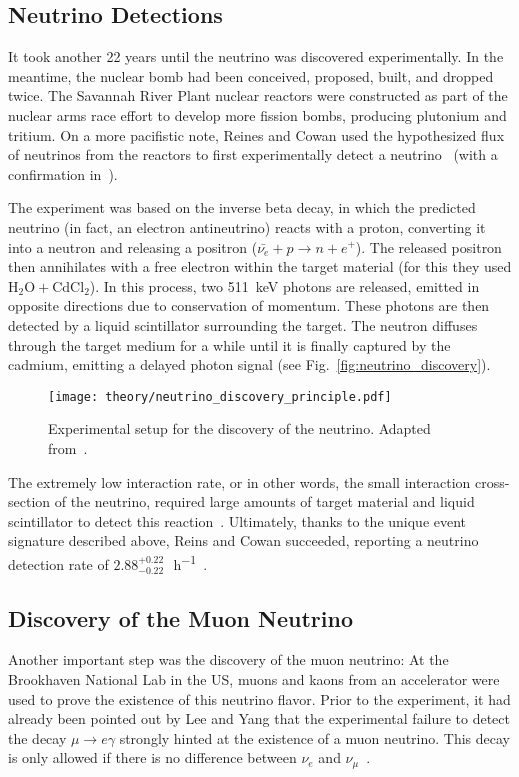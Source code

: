\subsection{Neutrino Detections}
It took another 22 years until the neutrino was discovered experimentally. In the meantime, the nuclear bomb had been conceived, proposed, built, and dropped twice. The Savannah River Plant nuclear reactors were constructed as part of the nuclear arms race effort to develop more fission bombs, producing plutonium and tritium. On a more pacifistic note, Reines and Cowan used the hypothesized flux of neutrinos from the reactors to first experimentally detect a neutrino~\cite{Reines1956} (with a confirmation in~).

The experiment was based on the inverse beta decay, in which the predicted neutrino (in fact, an electron antineutrino) reacts with a proton, converting it into a neutron and releasing a positron ($\bar{\nu_e} + p \rightarrow n + e^+$). The released positron then annihilates with a free electron within the target material (for this they used $\text{H}_2\text{O} + \text{CdCl}_2$). In this process, two \SI{511}{\kilo\eV} photons are released, emitted in opposite directions due to conservation of momentum. These photons are then detected by a liquid scintillator surrounding the target. The neutron diffuses through the target medium for a while until it is finally captured by the cadmium, emitting a delayed photon signal (see Fig.~\ref{fig:neutrino_discovery}).

\begin{figure}[htb]
    \texttt{[image: theory/neutrino\_discovery\_principle.pdf]}
    \caption[Neutrino discovery schematic]{Experimental setup for the discovery of the neutrino. Adapted from~\cite{Reines1956}.}
\end{figure}

The extremely low interaction rate, or in other words, the small interaction cross-section of the neutrino, required large amounts of target material and liquid scintillator to detect this reaction~\cite{Giunti2007}. Ultimately, thanks to the unique event signature described above, Reins and Cowan succeeded, reporting a neutrino detection rate of $2.88^{+0.22}_{-0.22}$\,\si{\ct\per\hour}~\cite{Reines1956}.

\subsection{Discovery of the Muon Neutrino}
Another important step was the discovery of the muon neutrino: At the Brookhaven National Lab in the US, muons and kaons from an accelerator were used to prove the existence of this neutrino flavor. Prior to the experiment, it had already been pointed out by Lee and Yang that the experimental failure to detect the decay $\mu \rightarrow e \gamma$ strongly hinted at the existence of a muon neutrino. This decay is only allowed if there is no difference between $\nu_e$ and $\nu_\mu$~.

